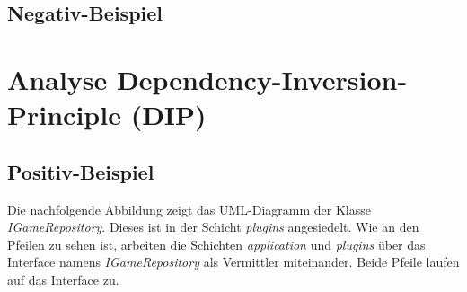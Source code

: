 \subsection{Negativ-Beispiel}

\section{Analyse Dependency-Inversion-Principle (DIP)}
\subsection{Positiv-Beispiel}
Die nachfolgende Abbildung zeigt das UML-Diagramm der Klasse
\textit{IGameRepository}. Dieses ist in der Schicht \textit{plugins}
angesiedelt. Wie an den Pfeilen zu sehen ist, arbeiten die Schichten
\textit{application} und \textit{plugins} über das Interface
namens \textit{IGameRepository} als Vermittler miteinander. Beide
Pfeile laufen auf das Interface zu. 

